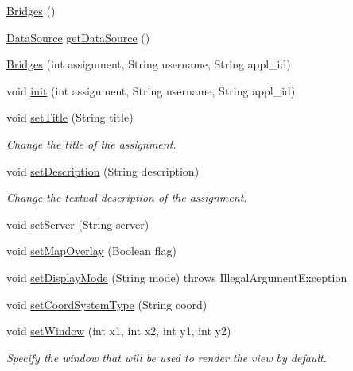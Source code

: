 \begin{DoxyCompactItemize}
\item 
\hyperlink{classbridges_1_1connect_1_1_bridges_a42f0592841a829f93453506c78951b1f}{Bridges} ()
\item 
\hyperlink{classbridges_1_1connect_1_1_data_source}{Data\+Source} \hyperlink{classbridges_1_1connect_1_1_bridges_acfe00a832969a77504d9d33d783c4fcd}{get\+Data\+Source} ()
\item 
\hyperlink{classbridges_1_1connect_1_1_bridges_a4c47eb7cbb94c5810dc38c38760db872}{Bridges} (int assignment, String username, String appl\+\_\+id)
\item 
void \hyperlink{classbridges_1_1connect_1_1_bridges_a87aa73367a43cfc8b3ae5e4926ea4895}{init} (int assignment, String username, String appl\+\_\+id)
\item 
void \hyperlink{classbridges_1_1connect_1_1_bridges_aed3752ee6318a48dff271d9a9e2a8fcc}{set\+Title} (String title)
\begin{DoxyCompactList}\small\item\em Change the title of the assignment. \end{DoxyCompactList}\item 
void \hyperlink{classbridges_1_1connect_1_1_bridges_a50d1d5aa64d312393b63d1be854e34a2}{set\+Description} (String description)
\begin{DoxyCompactList}\small\item\em Change the textual description of the assignment. \end{DoxyCompactList}\item 
void \hyperlink{classbridges_1_1connect_1_1_bridges_ab43e412448e1dfc340e58c407519a576}{set\+Server} (String server)
\item 
void \hyperlink{classbridges_1_1connect_1_1_bridges_a4af383ba2f114ad7bd4e08eb44096973}{set\+Map\+Overlay} (Boolean flag)
\item 
void \hyperlink{classbridges_1_1connect_1_1_bridges_aaa1a44a689daa26a841d0e8d31839861}{set\+Display\+Mode} (String mode)  throws Illegal\+Argument\+Exception 
\item 
void \hyperlink{classbridges_1_1connect_1_1_bridges_ade4a9c43e2b608e6b3dc774b73f95749}{set\+Coord\+System\+Type} (String coord)
\item 
void \hyperlink{classbridges_1_1connect_1_1_bridges_ac2f9a8d7852e499a7ed3521f06d470bf}{set\+Window} (int x1, int x2, int y1, int y2)
\begin{DoxyCompactList}\small\item\em Specify the window that will be used to render the view by default. \end{DoxyCompactList}\item 

\end{DoxyCompactItemize}
